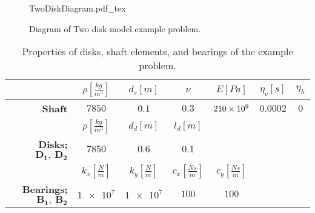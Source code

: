 \begin{figure}
	\centering
	\def\svgwidth{400pt}
	{TwoDiskDiagram.pdf_tex}
	\caption{Diagram of Two disk model example problem.}
	\label{fig:TwoDiskDiagram}
\end{figure}
\begin{table}
\caption{Properties of disks, shaft elements, and bearings of the example problem.} \label{tab:ExampleRotorTable}
\centering
\begin{tabular}{rcccccc}
						&$\rho[\frac{kg}{m^3}]$	&$d_s[m]$					&$\nu$				&$E[Pa]$			&$ \eta_v[s] $	&$ \eta_h $	\\\hline
	\textbf{Shaft}		&$7850$					&$0.1$					&$0.3$				&$\num{210E9}$		&$ 0.0002 $		&$ 0 $		\\[1em]
						&$\rho[\frac{kg}{m^3}]$	&$d_d[m]$					&$l_d[m]$				&					&				&			\\\hline
	\textbf{Disks;} $ \mathbf{D_1,\ D_2} $		&$7850$					&$0.6$					&$0.1$				&					&				&			\\[1em]
						&$k_x[\frac{N}{m}]$		&$k_y[\frac{N}{m}]$		&$c_x[\frac{Ns}{m}]$&$c_y[\frac{Ns}{m}]$&				&			\\\hline
	\textbf{Bearings;} $ \mathbf{B_1,\ B_2} $	&$\num{1e7}$			&$\num{1e7}$			&$100$				&$100$				&				&			
\end{tabular}
\centering
\end{table}
